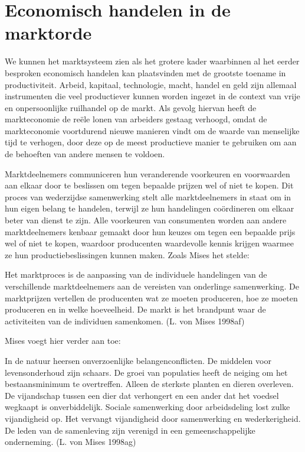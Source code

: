 \documentclass[
  a5paper,
  smalldemyvopaper,11pt,twoside,onecolumn,openright,extrafontsizes,
hidelinks]{memoir}
\begin{document}
\section{Economisch handelen in de
marktorde}\label{economisch-handelen-in-de-marktorde}

We kunnen het marktsysteem zien als het grotere kader waarbinnen al het
eerder besproken economisch handelen kan plaatsvinden met de grootste
toename in productiviteit. Arbeid, kapitaal, technologie, macht, handel
en geld zijn allemaal instrumenten die veel productiever kunnen worden
ingezet in de context van vrije en onpersoonlijke ruilhandel op de
markt. Als gevolg hiervan heeft de markteconomie de reële lonen van
arbeiders gestaag verhoogd, omdat de markteconomie voortdurend nieuwe
manieren vindt om de waarde van menselijke tijd te verhogen, door deze
op de meest productieve manier te gebruiken om aan de behoeften van
andere mensen te voldoen.

Marktdeelnemers communiceren hun veranderende voorkeuren en voorwaarden
aan elkaar door te beslissen om tegen bepaalde prijzen wel of niet te
kopen. Dit proces van wederzijdse samenwerking stelt alle
marktdeelnemers in staat om in hun eigen belang te handelen, terwijl ze
hun handelingen coördineren om elkaar beter van dienst te zijn. Alle
voorkeuren van consumenten worden aan andere marktdeelnemers kenbaar
gemaakt door hun keuzes om tegen een bepaalde prijs wel of niet te
kopen, waardoor producenten waardevolle kennis krijgen waarmee ze hun
productiebeslissingen kunnen maken. Zoals Mises het stelde:

Het marktproces is de aanpassing van de individuele handelingen van de
verschillende marktdeelnemers aan de vereisten van onderlinge
samenwerking. De marktprijzen vertellen de producenten wat ze moeten
produceren, hoe ze moeten produceren en in welke hoeveelheid. De markt
is het brandpunt waar de activiteiten van de individuen samenkomen. (L.
von Mises 1998af)

Mises voegt hier verder aan toe:

In de natuur heersen onverzoenlijke belangenconflicten. De middelen voor
levensonderhoud zijn schaars. De groei van populaties heeft de neiging
om het bestaansminimum te overtreffen. Alleen de sterkste planten en
dieren overleven. De vijandschap tussen een dier dat verhongert en een
ander dat het voedsel wegkaapt is onverbiddelijk. Sociale samenwerking
door arbeidsdeling lost zulke vijandigheid op. Het vervangt vijandigheid
door samenwerking en wederkerigheid. De leden van de samenleving zijn
verenigd in een gemeenschappelijke onderneming. (L. von Mises 1998ag)
\end{document}
